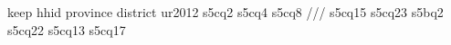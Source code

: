 keep hhid province district ur2012 s5cq2 s5cq4 s5cq8 /// 
s5cq15 s5cq23 s5bq2 s5cq22 s5cq13 s5cq17 
